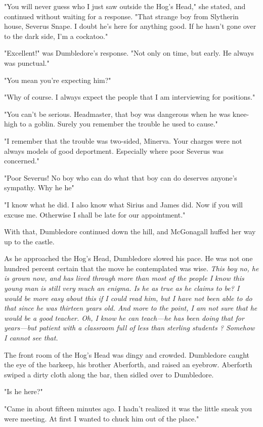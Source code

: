 "You will never guess who I just saw outside the Hog's Head," she stated, and continued without waiting for a response. "That strange boy from Slytherin house, Severus Snape. I doubt he's here for anything good. If he hasn't gone over to the dark side, I'm a cockatoo."

"Excellent!" was Dumbledore's response. "Not only on time, but early. He always was punctual."

"You mean you're expecting him?"

"Why of course. I always expect the people that I am interviewing for positions."

"You can't be serious. Headmaster, that boy was dangerous when he was knee-high to a goblin. Surely you remember the trouble he used to cause."

"I remember that the trouble was two-sided, Minerva. Your charges were not always models of good deportment. Especially where poor Severus was concerned."

"Poor Severus! No boy who can do what that boy can do deserves anyone's sympathy. Why he{\el} he{\el}"

"I know what he did. I also know what Sirius and James did. Now if you will excuse me. Otherwise I shall be late for our appointment."

With that, Dumbledore continued down the hill, and McGonagall huffed her way up to the castle.

As he approached the Hog's Head, Dumbledore slowed his pace. He was not one hundred percent certain that the move he contemplated was wise. \emph{This boy{\el} no, he is grown now, and has lived through more than most of the people I know{\el} this young man is still very much an enigma. Is he as true as he claims to be? I would be more easy about this if I could read him, but I have not been able to do that since he was thirteen years old. And more to the point, I am not sure that he would be a good teacher. Oh, I know he can teach—he has been doing that for years—but patient with a classroom full of less than sterling students{\el} ? Somehow I cannot see that.}

The front room of the Hog's Head was dingy and crowded. Dumbledore caught the eye of the barkeep, his brother Aberforth, and raised an eyebrow. Aberforth swiped a dirty cloth along the bar, then sidled over to Dumbledore.

"Is he here?"

"Came in about fifteen minutes ago. I hadn't realized it was the little sneak you were meeting. At first I wanted to chuck him out of the place."

